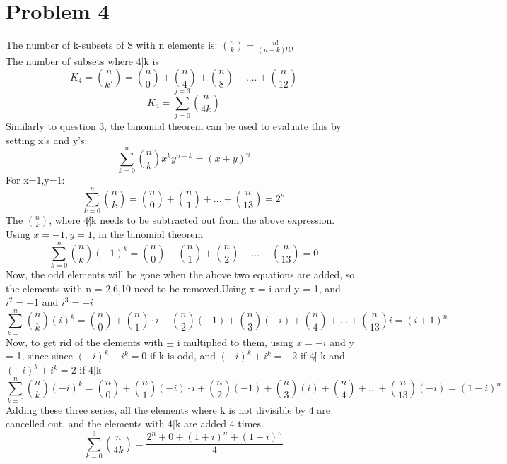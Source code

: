 \documentclass[english]{article}
\begin{document}
\section*{Problem 4}
The number of k-subsets of S with n elements is: $\binom{n}{k} = \frac{n!}{(n-k)! k!}$\\
The number of subsets where 4|k is $$ K_4 =  \binom{n}{k'} = \binom{n}{0} + \binom{n}{4} + \binom{n}{8}+....+\binom{n}{12}$$
$$ K_4 = \sum_{j=0}^{j=3}\binom{n}{4k}$$
Similarly to question 3, the binomial theorem can be used to evaluate this by setting x's and y's:
$$ \sum_{k=0}^n \binom{n}{k} x^k y^{n-k} = (x+y)^n $$
For x=1,y=1:
$$ \sum_{k=0}^n \binom{n}{k} = \binom{n}{0} + \binom{n}{1} + ...+\binom{n}{13} = 2^n $$
The $\binom{n}{k}$, where 4$\not|$k needs to be subtracted out from the above expression.
Using $x = -1, y = 1$, in the binomial theorem
$$ \sum_{k=0}^n \binom{n}{k} (-1)^k = \binom{n}{0} - \binom{n}{1} + \binom{n}{2} +...-\binom{n}{13} = 0$$
Now, the odd elements will be gone when the above two equations are added, so the elements with n = 2,6,10 need to be removed.Using x = i and y = 1, and $i^2 = -1 $ and $i^3 = - i$
$$ \sum_{k=0}^n \binom{n}{k} (i)^k = \binom{n}{0} + \binom{n}{1} \cdot i + \binom{n}{2} (-1)+ \binom{n}{3} (-i) + \binom{n}{4}+ ...+ \binom{n}{13} i  = (i + 1)^n$$
Now, to get rid of the elements with $\pm$ i multiplied to them, using $x = -i$ and y = 1, since  since $(-i)^k + i^k = 0$ if k is odd, and $(-i)^k + i^k = -2$ if 4$\not|$ k and $(-i)^k + i^k = 2$ if 4|k
$$ \sum_{k=0}^n \binom{n}{k} (-i)^k = \binom{n}{0} + \binom{n}{1} (-i) \cdot i + \binom{n}{2}(-1)+ \binom{n}{3} (i) + \binom{n}{4}+ ...+ \binom{n}{13} (-i) = (1-i)^n  $$
Adding these three series, all the elements where k is not divisible by 4 are cancelled out, and the elements with 4|k are added 4 times. 
$$ \sum_{k=0}^{3} \binom{n}{4k} = \frac{2^n + 0 + (1+i)^n + (1-i)^n}{4}$$
\end{document}
